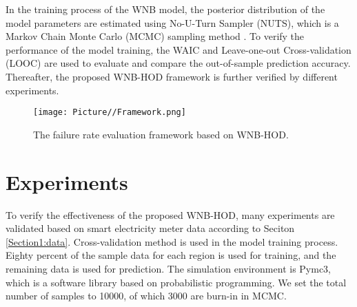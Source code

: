 \documentclass[journal,twoside,web]{ieeecolor}
\begin{document}
In the training process of the WNB model, the posterior distribution of the model parameters are estimated using No-U-Turn Sampler (NUTS), which is a Markov Chain Monte Carlo (MCMC) sampling method \cite{PyMC333}. To verify the performance of the model training, the WAIC and Leave-one-out Cross-validation (LOOC) are used to evaluate and compare the out-of-sample prediction accuracy.
Thereafter, the proposed WNB-HOD framework is further verified by different experiments.


\begin{figure}
	\centerline{\texttt{[image: Picture//Framework.png]}}
	\caption{The failure rate evaluation framework based on WNB-HOD.}
	\label{fig2}
\end{figure}






\section{Experiments}
\label{Section4}
To verify the effectiveness of the proposed WNB-HOD, many experiments are validated based on smart electricity meter data according to Seciton \ref{Section1:data}. Cross-validation method is used in the model training process. Eighty percent of the sample data for each region is used for training, and the remaining data is used for prediction. The simulation environment is Pymc3, which is a software library based on probabilistic programming. We set the total number of samples to 10000, of which 3000 are burn-in in MCMC.
\end{document}
